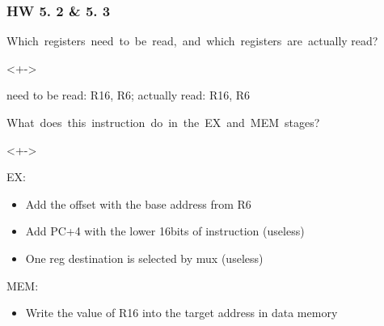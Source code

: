\documentclass[xcolor=table]{beamer}
\begin{document}
\begin{mdframe}%

\frametitle{HW 5. 2 \& 5. 3}\label{heading-sec-hw-5-2-5-3}%

\noindent{} Which  registers  need  to  be  read,  and  which  registers  are  actually read?%

\mdhr{}%

\begin{onlyenv}<+->%
\begin{mdbmargintb}{}{}%
\noindent{}need to be read: R16, R6; actually read: R16, R6%
\end{mdbmargintb}%
\end{onlyenv}%

 What  does  this  instruction  do  in  the  EX  and  MEM  stages?%

\mdhr{}%

\begin{onlyenv}<+->%

\noindent{}EX:%

\begin{itemize}[noitemsep,topsep=\mdcompacttopsep]%

\item{}Add the offset with the base address from R6%

\item{}Add PC+4 with the lower 16bits of instruction (useless)%

\item{}One reg destination is selected by mux (useless)%
\end{itemize}%

\noindent{}MEM:%

\begin{itemize}[noitemsep,topsep=\mdcompacttopsep]%

\item{}Write the value of R16 into the target address in data memory%
\end{itemize}%
\end{onlyenv}%
\end{mdframe}\label{sec-hw-5-2-5-3}%
\end{document}

